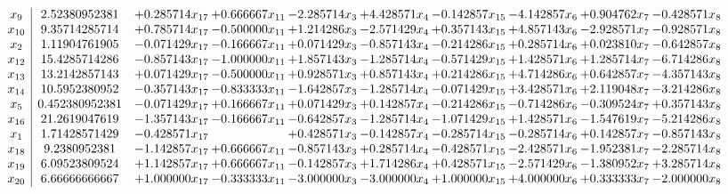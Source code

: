 \documentclass[10pt]{article}
\begin{document}
 \[\begin{array}{c| c c@{\hskip 2pt} c@{\hskip 2pt} c@{\hskip 2pt} c@{\hskip 2pt} c@{\hskip 2pt} c@{\hskip 2pt} c@{\hskip 2pt} c@{\hskip 2pt} }
 x_{9}   &  2.52380952381 & + 0.285714 x_{17} & + 0.666667 x_{11} & -2.285714 x_{3} & + 4.428571 x_{4} & -0.142857 x_{15} & -4.142857 x_{6} & + 0.904762 x_{7} & -0.428571 x_{8}\\
 x_{10}   &  9.35714285714 & + 0.785714 x_{17} & -0.500000 x_{11} & + 1.214286 x_{3} & -2.571429 x_{4} & + 0.357143 x_{15} & + 4.857143 x_{6} & -2.928571 x_{7} & -0.928571 x_{8}\\
 x_{2}   &  1.11904761905 & -0.071429 x_{17} & -0.166667 x_{11} & + 0.071429 x_{3} & -0.857143 x_{4} & -0.214286 x_{15} & + 0.285714 x_{6} & + 0.023810 x_{7} & -0.642857 x_{8}\\
 x_{12}   &  15.4285714286 & -0.857143 x_{17} & -1.000000 x_{11} & + 1.857143 x_{3} & -1.285714 x_{4} & -0.571429 x_{15} & + 1.428571 x_{6} & + 1.285714 x_{7} & -6.714286 x_{8}\\
 x_{13}   &  13.2142857143 & + 0.071429 x_{17} & -0.500000 x_{11} & + 0.928571 x_{3} & + 0.857143 x_{4} & + 0.214286 x_{15} & + 4.714286 x_{6} & + 0.642857 x_{7} & -4.357143 x_{8}\\
 x_{14}   &  10.5952380952 & -0.357143 x_{17} & -0.833333 x_{11} & -1.642857 x_{3} & -1.285714 x_{4} & -0.071429 x_{15} & + 3.428571 x_{6} & + 2.119048 x_{7} & -3.214286 x_{8}\\
 x_{5}   &  0.452380952381 & -0.071429 x_{17} & + 0.166667 x_{11} & + 0.071429 x_{3} & + 0.142857 x_{4} & -0.214286 x_{15} & -0.714286 x_{6} & -0.309524 x_{7} & + 0.357143 x_{8}\\
 x_{16}   &  21.2619047619 & -1.357143 x_{17} & -0.166667 x_{11} & -0.642857 x_{3} & -1.285714 x_{4} & -1.071429 x_{15} & + 1.428571 x_{6} & -1.547619 x_{7} & -5.214286 x_{8}\\
 x_{1}   &  1.71428571429 & -0.428571 x_{17} &   & + 0.428571 x_{3} & -0.142857 x_{4} & -0.285714 x_{15} & -0.285714 x_{6} & + 0.142857 x_{7} & -0.857143 x_{8}\\
 x_{18}   &  9.2380952381 & -1.142857 x_{17} & + 0.666667 x_{11} & -0.857143 x_{3} & + 0.285714 x_{4} & -0.428571 x_{15} & -2.428571 x_{6} & -1.952381 x_{7} & -2.285714 x_{8}\\
 x_{19}   &  6.09523809524 & + 1.142857 x_{17} & + 0.666667 x_{11} & -0.142857 x_{3} & + 1.714286 x_{4} & + 0.428571 x_{15} & -2.571429 x_{6} & -1.380952 x_{7} & + 3.285714 x_{8}\\
 x_{20}   &  6.66666666667 & + 1.000000 x_{17} & -0.333333 x_{11} & -3.000000 x_{3} & -3.000000 x_{4} & + 1.000000 x_{15} & + 4.000000 x_{6} & + 0.333333 x_{7} & -2.000000 x_{8}\\

\end{array}\]
\end{document}
